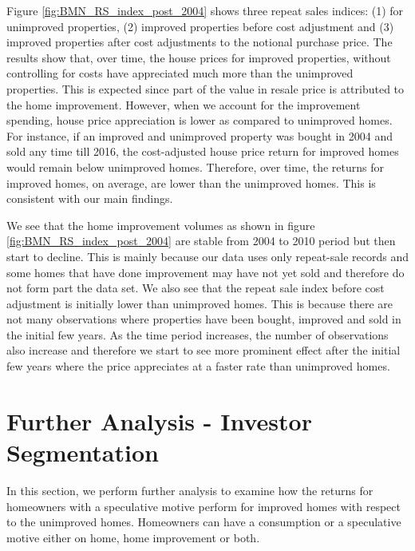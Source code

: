 \documentclass[AEJ,reqno, draftmode]{AEA} %
\begin{document}
%
Figure \ref{fig:BMN_RS_index_post_2004} shows three repeat sales indices: (1) for unimproved properties, (2) improved properties before cost adjustment and (3) improved properties after cost adjustments to the notional purchase price. The results show that, over time, the house prices for improved properties, without controlling for costs have appreciated much more than the unimproved properties. This is expected since part of the value in resale price is attributed to the home improvement. However, when we account for the improvement spending, house price appreciation is lower as compared to unimproved homes. For instance, if an improved and unimproved property was bought in 2004 and sold any time till 2016, the cost-adjusted house price return for improved homes would remain below unimproved homes. Therefore, over time, the returns for improved homes, on average, are lower than the unimproved homes. This is consistent with our main findings. 

We see that the home improvement volumes as shown in figure \ref{fig:BMN_RS_index_post_2004} are stable from 2004 to 2010 period but then start to decline. This is mainly because our data uses only repeat-sale records and some homes that have done improvement may have not yet sold and therefore do not form part the data set. We also see that the repeat sale index before cost adjustment is initially lower than unimproved homes. This is because there are not many observations where properties have been bought, improved and sold in the initial few years. As the time period increases, the number of observations also increase and therefore we start to see more prominent effect after the initial few years where the price appreciates at a faster rate than unimproved homes.


\section{Further Analysis - Investor Segmentation}

In this section, we perform further analysis to examine how the returns for homeowners with a speculative motive perform for improved homes with respect to the unimproved homes. Homeowners can have a consumption or a speculative motive either on home, home improvement or both. 
\end{document}
